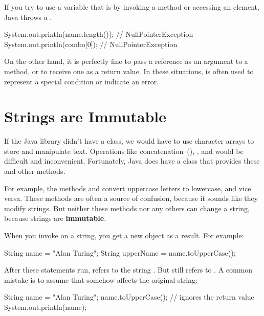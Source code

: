 
If you try to use a variable that is  by invoking a method or accessing an element, Java throws a .

\begin{code}
System.out.println(name.length());  // NullPointerException
System.out.println(combo[0]);       // NullPointerException
\end{code}

On the other hand, it is perfectly fine to pass a  reference as an argument to a method, or to receive one as a return value.
In these situations,  is often used to represent a special condition or indicate an error.


\section{Strings are Immutable}

If the Java library didn't have a  class, we would have to use character arrays to store and manipulate text.
Operations like concatenation~(\java{+}), , and  would be difficult and inconvenient.
Fortunately, Java does have a  class that provides these and other methods.


For example, the methods  and  convert uppercase letters to lowercase, and vice versa.
These methods are often a source of confusion, because it sounds like they modify strings.
But neither these methods nor any others can change a string, because strings are {\bf immutable}.

When you invoke  on a string, you get a new  object as a result.
For example:

\begin{code}
String name = "Alan Turing";
String upperName = name.toUpperCase();
\end{code}


After these statements run,  refers to the string .
But  still refers to .
A common mistake is to assume that  somehow affects the original string:

\begin{code}
String name = "Alan Turing";
name.toUpperCase();           // ignores the return value
System.out.println(name);
\end{code}

